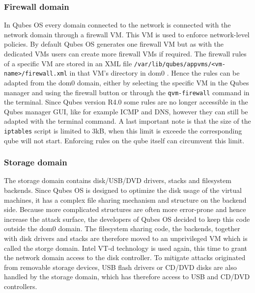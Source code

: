 \documentclass[runningheads,a4paper]{article}
\begin{document}
\subsubsection{Firewall domain}

In Qubes OS every domain connected to the network is connected with
the network domain through a firewall VM. This VM is used to enforce
network-level policies. By default Qubes OS generates one firewall VM
but as with the dedicated VMs users can create more firewall VMs if
required. The firewall rules of a specific VM are stored in an XML
file \texttt{/var/lib/qubes/appvms/<vm-name>/firewall.xml} in that VM's
directory in dom0 . Hence the rules can be adapted from the dom0
domain, either by selecting the specific VM in the Qubes manager and
using the firewall button or through the \texttt{qvm-firewall} command
in the terminal. Since Qubes version R4.0 some rules are no longer
accessible in the Qubes manager GUI, like for example ICMP and DNS,
however they can still be adapted with the terminal command. A last
important note is that the size of the \texttt{iptables} script is
limited to 3kB, when this limit is exceede the corresponding qube will
not start. Enforcing rules on the qube itself can circumvent this
limit.

\subsubsection{Storage domain}

The storage domain contains disk/USB/DVD drivers, stacks and
filesystem backends. Since Qubes OS is designed to optimize the disk
usage of the virtual machines, it has a complex file sharing mechanism
and structure on the backend side. Because more complicated structures
are often more error-prone and hence increase the attack surface, the
developers of Qubes OS decided to keep this code outside the dom0
domain. The filesystem sharing code, the backends, together with disk
drivers and stacks are therefore moved to an unprivileged VM which is
called the storge domain. Intel VT-d technology is used again, this
time to grant the network domain access to the disk controller. To
mitigate attacks originated from removable storage devices, USB flash
drivers or CD/DVD disks are also handled by the storage domain, which
has therefore access to USB and CD/DVD controllers.
\end{document}
